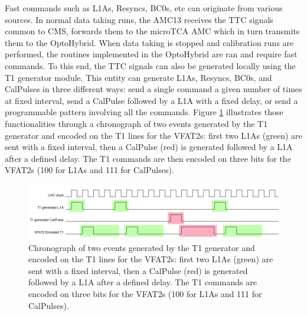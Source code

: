       Fast commands such as L1As, Resyncs, BC0s, etc can originate from various sources. In normal data taking runs, the AMC13 receives the TTC signals common to CMS, forwards them to the microTCA AMC which in turn transmits them to the OptoHybrid. When data taking is stopped and calibration runs are performed, the routines implemented in the OptoHybrid are ran and require fast commands. To this end, the TTC signals can also be generated locally using the T1 generator module. This entity can generate L1As, Resyncs, BC0s, and CalPulses in three different ways: send a single command a given number of times at fixed interval, send a CalPulse followed by a L1A with a fixed delay, or send a programmable pattern involving all the commands. Figure \ref{fig:II-3-t1-chrono} illustrates those functionalities through a chronograph of two events generated by the T1 generator and encoded on the T1 lines for the VFAT2s: first two L1As (green) are sent with a fixed interval, then a CalPulse (red) is generated followed by a L1A after a defined delay. The T1 commands are then encoded on three bits for the VFAT2s (100 for L1As and 111 for CalPulses). \\

      \begin{figure}[h!]
        \centering
        \includegraphics[width=\textwidth]{img/II-3-test-beam/t1-chrono.png}
        \caption{Chronograph of two events generated by the T1 generator and encoded on the T1 lines for the VFAT2s: first two L1As (green) are sent with a fixed interval, then a CalPulse (red) is generated followed by a L1A after a defined delay. The T1 commands are encoded on three bits for the VFAT2s (100 for L1As and 111 for CalPulses).}
        \label{fig:II-3-t1-chrono}
      \end{figure}

